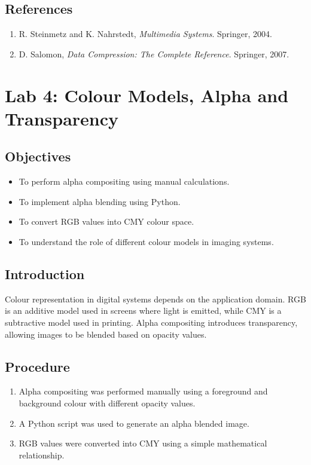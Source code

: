 \documentclass[12pt,a4paper]{article}
\begin{document}
\subsection{References}

\begin{enumerate}
    \item R. Steinmetz and K. Nahrstedt, \textit{Multimedia Systems}. Springer, 2004.
    \item D. Salomon, \textit{Data Compression: The Complete Reference}. Springer, 2007.
\end{enumerate}
\newpage

\section{Lab 4: Colour Models, Alpha and Transparency}

\subsection{Objectives}

\begin{itemize}
    \item To perform alpha compositing using manual calculations.
    \item To implement alpha blending using Python.
    \item To convert RGB values into CMY colour space.
    \item To understand the role of different colour models in imaging systems.
\end{itemize}

\subsection{Introduction}

Colour representation in digital systems depends on the application domain. RGB is an additive model used in screens where light is emitted, while CMY is a subtractive model used in printing. Alpha compositing introduces transparency, allowing images to be blended based on opacity values.

\subsection{Procedure}

\begin{enumerate}
    \item Alpha compositing was performed manually using a foreground and background colour with different opacity values.
    \item A Python script was used to generate an alpha blended image.
    \item RGB values were converted into CMY using a simple mathematical relationship.
\end{enumerate}
\end{document}
